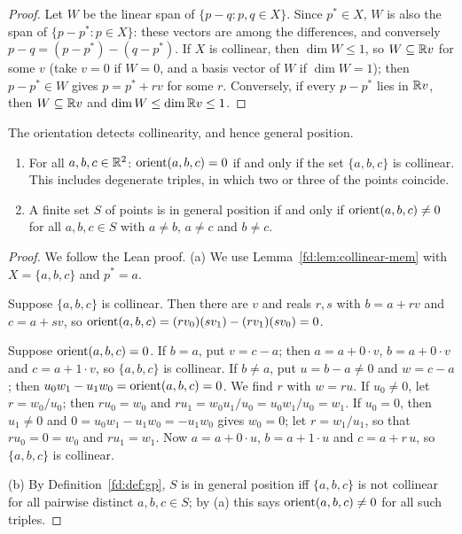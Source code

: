 \begin{proof}
Let $W$ be the linear span of $\{p-q:p,q\in X\}$. Since $p^*\in X$, $W$ is also the span of
$\{p-p^*:p\in X\}$: these vectors are among the differences, and conversely
$p-q=(p-p^*)-(q-p^*)$. If $X$ is collinear, then $\dim W\le1$, so $W\subseteq\mathbb R v$ for some $v$ (take
$v=0$ if $W=0$, and a basis vector of $W$ if $\dim W=1$); then $p-p^*\in W$ gives $p=p^*+rv$ for some
$r$. Conversely, if every $p-p^*$ lies in $\mathbb R v$, then $W\subseteq\mathbb R v$ and $\dim W\le\dim\mathbb R v\le1$.
\end{proof}

\begin{lemma}\label{fd:lem:collinear}\sloppy{}
The orientation detects collinearity, and hence general position.
\begin{enumerate}[label=(\alph*)]
\item For all $a,b,c\in\mathbb R^2$: $\operatorname{orient}(a,b,c)=0$ if and only if the set $\{a,b,c\}$ is collinear. This
  includes degenerate triples, in which two or three of the points coincide.
\item A finite set $S$ of points is in general position if and only if $\operatorname{orient}(a,b,c)\ne0$ for all
  $a,b,c\in S$ with $a\ne b$, $a\ne c$ and $b\ne c$.
\end{enumerate}
\end{lemma}

\begin{proof}
We follow the Lean proof. (a) We use Lemma~\ref{fd:lem:collinear-mem} with $X=\{a,b,c\}$ and $p^*=a$.

Suppose $\{a,b,c\}$ is collinear. Then there are $v$ and reals $r,s$ with $b=a+rv$ and $c=a+sv$, so
$\operatorname{orient}(a,b,c)=(rv_0)(sv_1)-(rv_1)(sv_0)=0$.

Suppose $\operatorname{orient}(a,b,c)=0$. If $b=a$, put $v=c-a$; then $a=a+0\cdot v$, $b=a+0\cdot v$ and $c=a+1\cdot v$, so
$\{a,b,c\}$ is collinear. If $b\ne a$, put $u=b-a\ne0$ and $w=c-a$; then
$u_0w_1-u_1w_0=\operatorname{orient}(a,b,c)=0$. We find $r$ with $w=ru$. If $u_0\ne0$, let $r=w_0/u_0$; then $ru_0=w_0$
and $ru_1=w_0u_1/u_0=u_0w_1/u_0=w_1$. If $u_0=0$, then $u_1\ne0$ and $0=u_0w_1-u_1w_0=-u_1w_0$ gives
$w_0=0$; let $r=w_1/u_1$, so that $ru_0=0=w_0$ and $ru_1=w_1$. Now $a=a+0\cdot u$, $b=a+1\cdot u$ and
$c=a+r\,u$, so $\{a,b,c\}$ is collinear.

(b) By Definition~\ref{fd:def:gp}, $S$ is in general position iff $\{a,b,c\}$ is not collinear for all
pairwise distinct $a,b,c\in S$; by (a) this says $\operatorname{orient}(a,b,c)\ne0$ for all such triples.
\end{proof}

